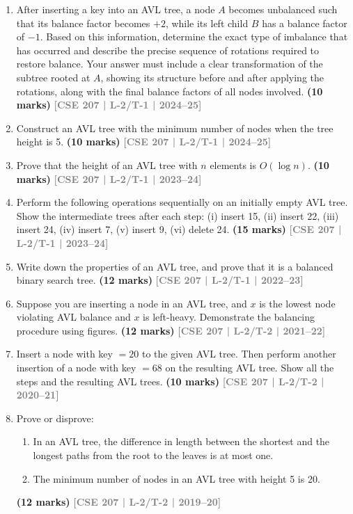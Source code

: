 \documentclass[12pt]{article}
\newcommand{\yr}[1]{\hfill\textcolor{gray}{\small\textbf{[#1]}}}
\newcommand{\mk}[1]{\textcolor{orange!70!black}{\small\textbf{(#1 marks)}}}
\begin{document}
\begin{enumerate}

  \item After inserting a key into an AVL tree, a node $A$ becomes unbalanced such that its balance factor becomes $+2$, while its left child $B$ has a balance factor of $-1$. Based on this information, determine the exact type of imbalance that has occurred and describe the precise sequence of rotations required to restore balance. Your answer must include a clear transformation of the subtree rooted at $A$, showing its structure before and after applying the rotations, along with the final balance factors of all nodes involved.
    \mk{10} \yr{CSE 207 | L-2/T-1 | 2024--25}


  \item Construct an AVL tree with the minimum number of nodes when the tree height is 5.
    \mk{10} \yr{CSE 207 | L-2/T-1 | 2024--25}


  \item Prove that the height of an AVL tree with $n$ elements is $O(\log n)$.
    \mk{10} \yr{CSE 207 | L-2/T-1 | 2023--24}


  \item Perform the following operations sequentially on an initially empty AVL tree. Show the intermediate trees after each step: (i) insert 15, (ii) insert 22, (iii) insert 24, (iv) insert 7, (v) insert 9, (vi) delete 24.
    \mk{15} \yr{CSE 207 | L-2/T-1 | 2023--24}


  \item Write down the properties of an AVL tree, and prove that it is a balanced binary search tree.
    \mk{12} \yr{CSE 207 | L-2/T-1 | 2022--23}



  \item Suppose you are inserting a node in an AVL tree, and $x$ is the lowest node violating AVL balance and $x$ is left-heavy. Demonstrate the balancing procedure using figures.
    \mk{12} \yr{CSE 207 | L-2/T-2 | 2021--22}


  \item Insert a node with key $= 20$ to the given AVL tree. Then perform another insertion of a node with key $= 68$ on the resulting AVL tree. Show all the steps and the resulting AVL trees.
    \FigGivenTree
    \mk{10} \yr{CSE 207 | L-2/T-2 | 2020--21}


  \item Prove or disprove:
    \begin{enumerate}
      \item In an AVL tree, the difference in length between the shortest and the longest paths from the root to the leaves is at most one.
      \item The minimum number of nodes in an AVL tree with height 5 is 20.
    \end{enumerate}
    \mk{12} \yr{CSE 207 | L-2/T-2 | 2019--20}



\end{enumerate}
\end{document}

